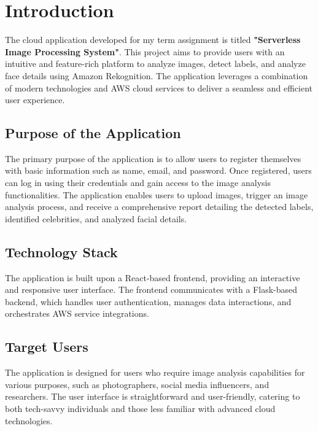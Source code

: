 
\newpage

\clearpage

\chapter{Introduction}
The cloud application developed for my term assignment is titled \textbf{"Serverless Image Processing System"}. This project aims to provide users with an intuitive and feature-rich platform to analyze images, detect labels, and analyze face details using Amazon Rekognition. The application leverages a combination of modern technologies and AWS cloud services to deliver a seamless and efficient user experience.

\section{Purpose of the Application}
The primary purpose of the application is to allow users to register themselves with basic information such as name, email, and password. Once registered, users can log in using their credentials and gain access to the image analysis functionalities. The application enables users to upload images, trigger an image analysis process, and receive a comprehensive report detailing the detected labels, identified celebrities, and analyzed facial details.

\section{Technology Stack}
The application is built upon a React-based frontend, providing an interactive and responsive user interface. The frontend communicates with a Flask-based backend, which handles user authentication, manages data interactions, and orchestrates AWS service integrations.

\section{Target Users}
The application is designed for users who require image analysis capabilities for various purposes, such as photographers, social media influencers, and researchers. The user interface is straightforward and user-friendly, catering to both tech-savvy individuals and those less familiar with advanced cloud technologies.

